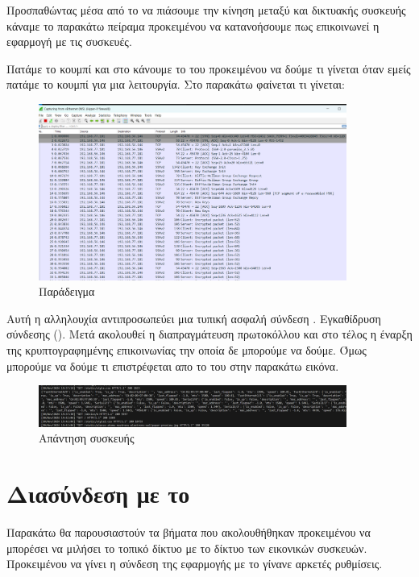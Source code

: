 Προσπαθώντας μέσα από το  να πιάσουμε την κίνηση μεταξύ
 και δικτυακής συσκευής κάναμε το παρακάτω πείραμα προκειμένου να κατανοήσουμε 
πως επικοινωνεί η εφαρμογή με τις συσκευές.

Πατάμε το κουμπί  
και στο  κάνουμε 
το  του  προκειμένου να δούμε τι γίνεται όταν εμείς πατάμε
το κουμπί για μια λειτουργία. Στο παρακάτω  φαίνεται τι γίνεται:

\begin{figure}[htb]
	\centering
	\includegraphics[width=0.9\textwidth]{graphics/wireshark.png}
	\caption{Παράδειγμα  }
\end{figure}

Αυτή η αλληλουχία αντιπροσωπεύει μια τυπική ασφαλή σύνδεση . Εγκαθίδρυση  σύνδεσης (). Μετά ακολουθεί η
διαπραγμάτευση πρωτοκόλλου  και στο τέλος η έναρξη της κρυπτογραφημένης επικοινωνίας την οποία δε μπορούμε να δούμε. Όμως μπορούμε να δούμε τι επιστρέφεται 
απο το  του  στην παρακάτω εικόνα.


\begin{figure}[htb]
	\centering
	\includegraphics[width=0.9\textwidth]{graphics/rest.png}
	\caption{Απάντηση συσκευής}
\end{figure}


\section{Διασύνδεση με το }

Παρακάτω θα παρουσιαστούν τα βήματα που ακολουθήθηκαν προκειμένου να μπορέσει να μιλήσει το τοπικό δίκτυο με
το δίκτυο των εικονικών συσκευών. Προκειμένου να γίνει η σύνδεση της εφαρμογής με το  γίνανε αρκετές
ρυθμίσεις.

